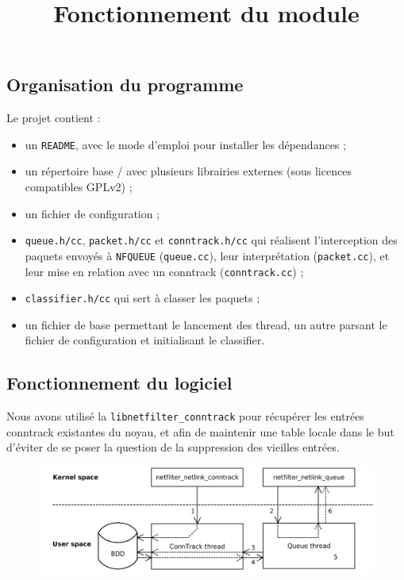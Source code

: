 \subsection{Organisation du programme}
Le projet contient :
\begin{itemize}
\item un \verb+README+, avec le mode d'emploi pour installer les dépendances ;
\item un répertoire base / avec plusieurs librairies externes (sous
licences compatibles GPLv2) ;
\item un fichier de configuration ;
\item \verb+queue.h/cc+, \verb+packet.h/cc+ et \verb+conntrack.h/cc+ qui réalisent l'interception des paquets envoyés à \verb+NFQUEUE+ (\verb+queue.cc+), leur
interprétation (\verb+packet.cc+), et leur mise en relation avec un conntrack
(\verb+conntrack.cc+) ;
\item \verb+classifier.h/cc+ qui sert à classer les paquets ;
\item un fichier de base permettant le lancement des thread, un autre parsant le fichier de configuration et initialisant le classifier.
\end{itemize}

\subsection{Fonctionnement du logiciel}
Nous avons utilisé la \verb+libnetfilter_conntrack+ pour
récupérer les entrées conntrack existantes du noyau, et afin de maintenir une table locale dans le but d'éviter de se poser la question de la suppression des vieilles entrées.

\begin{figure}[h]
\centering
\includegraphics[width=\textwidth]{schema2.png}\\
\title{Fonctionnement du module}
\end{figure}

